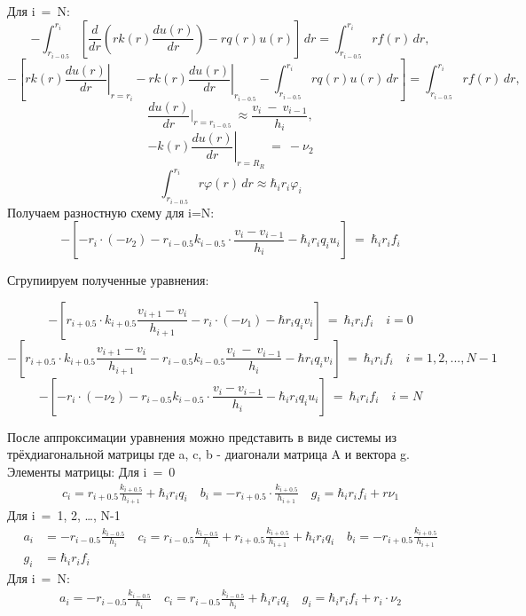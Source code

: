 Для i\ =\ N:
  \[-\int_{r_{i-0.5} }^{r_{i}} \left[\frac{d}{dr}\left(r k(r) \frac{du(r)}{dr}\right) -r q(r)u(r)\right]  \,dr = \int_{r_{i-0.5}}^{r_{i}} r f(r) \,dr, \]
  \[-\left[r k(r)\left.\frac{du(r)}{dr} \right\vert_{r=r_{i}} - r k(r) \left. \frac{du(r)}{dr}\right\vert_{r_{i-0.5}} - \int_{r_{i-0.5}}^{r_i} r q(r) u(r)  \,dr \right]
  = \int_{r_{i-0.5}}^{r_i} r f(r) \,dr, \]
  \[\frac{du(r)}{dr}\vert_{r = r_{i-0.5}}\ \approx \frac{v_{i}\ -\ v_{i-1}}{h_{i}}, \]
  \[-k(r)\left. \frac{du(r)}{dr} \right\vert_{r=R_R}\ =\ -\nu_2 \]
  \[\int_{r_{i-0.5}}^{r_i} r \varphi(r) \,dr \approx \hbar_i r_i \varphi_i \]
Получаем разностную схему для i=N:
\[
  -\left[ -r_i \cdot (-\nu_2) - r_{i-0.5}k_{i-0.5} \cdot \frac{v_i-v_{i-1}}{h_i}- \hbar_ir_iq_iu_i \right]\ =\ \hbar_ir_if_i
\]

Сгрупиируем полученные уравнения:

\[
  -\left[ r_{i+0.5} \cdot k_{i+0.5}\frac{v_{i+1}-v_i}{h_{i+1}} - r_i \cdot (-\nu_1) - \hbar r_i q_i v_i \right]\ =\ \hbar_ir_if_i \quad i = 0
\]
\[
-\left[ r_{i+0.5} \cdot k_{i+0.5}\frac{v_{i+1}-v_i}{h_{i+1}} - r_{i-0.5}k_{i-0.5}\frac{v_{i}\ -\ v_{i-1}}{h_{i}} - \hbar r_i q_i v_i\right]\ =\ \hbar_ir_if_i \quad i = 1, 2, ..., N -1
\]
\[
-\left[ -r_i \cdot (-\nu_2) - r_{i-0.5}k_{i-0.5} \cdot \frac{v_i-v_{i-1}}{h_i}- \hbar_ir_iq_iu_i \right]\ =\ \hbar_ir_if_i \quad i = N
\]

После аппроксимации уравнения можно представить в виде системы из трёхдиагональной матрицы где a, c, b - диагонали матрица A и вектора g. Элементы матрицы:\newline
Для i\ =\ 0
\begin{align*}
  c_i = r_{i+0.5}\frac{k_{i+0.5}}{h_{i+1}} + \hbar_ir_iq_i \quad
  b_i = -r_{i+0.5} \cdot \frac{k_{i+0.5}}{h_{i+1}} \quad
  g_i = \hbar_ir_if_i + r\nu_1
\end{align*}
Для i\ =\ 1, 2, \dots, N-1
\begin{align*}
  a_i &= -r_{i-0.5}\frac{k_{i-0.5}}{h_i} \quad
  c_i = r_{i-0.5}\frac{k_{i-0.5}}{h_i} + r_{i+0.5}\frac{k_{i+0.5}}{h_{i+1}} + \hbar_i r_iq_i \quad
  b_i = -r_{i+0.5}\frac{k_{i+0.5}}{h_{i+1}} \\
  g_i &= \hbar_i r_i f_i
\end{align*}
Для i\ =\ N:
\begin{align*}
  a_i = -r_{i-0.5}\frac{k_{i-0.5}}{h_i} \quad
  c_i = r_{i-0.5}\frac{k_{i-0.5}}{h_i} + \hbar_i r_iq_i \quad
  g_i = \hbar_i r_i f_i + r_i \cdot \nu_2
\end{align*}
